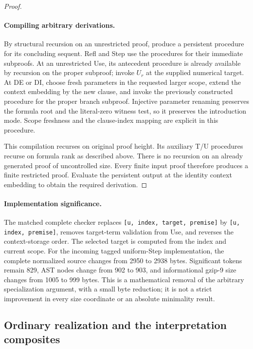 \documentclass[11pt,letterpaper]{article}
\theoremstyle{definition}
\begin{document}
\begin{proof}
\paragraph{Compiling arbitrary derivations.}
By structural recursion on an unrestricted proof, produce a persistent
procedure for its concluding sequent.  Refl and Step use the procedures
for their immediate subproofs.  At an unrestricted Use, its antecedent
procedure is already available by recursion on the proper subproof;
invoke \(U_r\) at the supplied numerical target.  At DE or DI, choose
fresh parameters in the requested larger scope, extend the context
embedding by the new clause, and invoke the previously constructed
procedure for the proper branch subproof.  Injective parameter renaming
preserves the formula root and the literal-zero witness test, so it
preserves the introduction mode.  Scope freshness and the clause-index
mapping are explicit in this procedure.

This compilation recurses on original proof height.  Its auxiliary T/U
procedures recurse on formula rank as described above.  There is no
recursion on an already generated proof of uncontrolled size.  Every
finite input proof therefore produces a finite restricted proof.
Evaluate the persistent output at the identity context embedding to
obtain the required derivation.
\end{proof}

\paragraph{Implementation significance.}
The matched complete checker replaces
\texttt{[u, index, target, premise]} by \texttt{[u, index, premise]}, removes
target-term validation from Use, and reverses the context-storage order.
The selected target is computed from the index and current scope.
For the incoming tagged uniform-Step implementation, the complete
normalized source changes from 2950 to 2938 bytes.  Significant tokens
remain 829, AST nodes change from 902 to 903, and informational gzip-9
size changes from 1005 to 999 bytes.  This is a mathematical removal of
the arbitrary specialization argument, with a small byte reduction;
it is not a strict improvement in every size coordinate or an absolute
minimality result.

\subsection{Ordinary realization and the interpretation composites}
\end{document}
